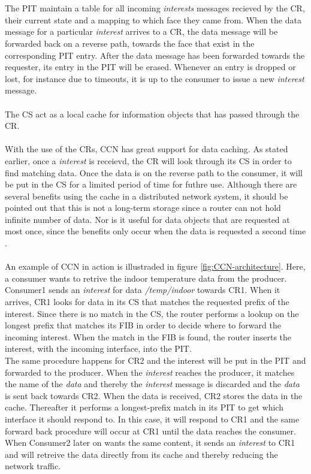 \\\\
The PIT maintain a table for all incoming \textit{interests} messages recieved by the CR, their current state and a mapping to which face they came from. When the data message for a particular \textit{interest} arrives to a CR, the data message will be forwarded back on a reverse path, towards the face that exist in the corresponding PIT entry. After the data message has been forwarded towards the requester, its entry in the PIT will be erased. Whenever an entry is dropped or lost, for instance due to timeouts, it is up to the consumer to issue a new \textit{interest} message.\
\\\\
The CS act as a local cache for information objects that has passed through the CR.
\\\\
With the use of the CRs, CCN has great support for data caching. As stated earlier, once a \textit{interest} is receievd, the CR will look through its CS in order to find matching data. Once the data is on the reverse path to the consumer, it will be put in the CS for a limited period of time for futhre use. Although there are several benefits using the cache in a distributed network system, it should be pointed out that this is not a long-term storage since a router can not hold infinite number of data. Nor is it useful for data objects that are requested at most once, since the benefits only occur when the data is requested a second time \cite{Ahlgreniot}\cite{Ahlgren2012}. %
\\\\
An example of CCN in action is illustraded in figure \ref{fig:CCN-architecture}. Here, a consumer wants to retrive the indoor temperature data from the producer.
Consumer1 sends an \textit{interest} for data \textit{/temp/indoor} towards CR1. When it arrives, CR1 looks for data in its CS that matches the requested prefix of the interest. Since there is no match in the CS, the router performs a lookup on the longest prefix that matches its FIB in order to decide where to forward the incoming interest. When the match in the FIB is found, the router inserts the interest, with the incoming interface, into the PIT.\\
The same procedure happens for CR2 and the interest will be put in the PIT and forwarded to the producer. When the \textit{interest} reaches the producer, it matches the name of the \textit{data} and thereby the \textit{interest} message is discarded and the \textit{data} is sent back towards CR2. When the data is received, CR2 stores the data in the cache. Thereafter it performs a longest-prefix match in its PIT to get which interface it should respond to. In this case, it will respond to CR1 and the same forward back procedure will occur at CR1 until the data reaches the consumer.\\
When Consumer2 later on wants the same content, it sends an \textit{interest} to CR1 and will retreive the data directly from its cache and thereby reducing the network traffic.



